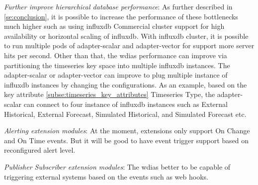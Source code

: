 \emph{Further improve hierarchical database performance}:
As further described in \ref{se:conclusion}, it is possible to increase the performance of these bottlenecks much higher such as using \acrshort{influxdb} Commercial cluster support for high availability or horizontal scaling of \acrshort{influxdb}. With \acrshort{influxdb} cluster, it is possible to run multiple pods of adapter-scalar and adapter-vector for support more server hits per second.
Other than that, the \acrshort{wdias} performance can improve via partitioning the timeseries key space into multiple \acrshort{influxdb} instances. The adapter-scalar or adapter-vector can improve to plug multiple instance of \acrshort{influxdb} instances by changing the configurations. As an example, based on the key attribute \ref{subse:timeseries_key_attributes} Timeseries Type, the adapter-scalar can connect to four instance of \acrshort{influxdb} instances such as  External Historical, External Forecast, Simulated Historical, and Simulated Forecast etc.

\emph{Alerting extension modules}:
At the moment, extensions only support On Change and On Time events. But it will be good to have event trigger support based on reconfigured alert level.

\emph{Publisher Subscriber extension modules}:
The \acrshort{wdias} better to be capable of triggering external systems based on the events such as web hooks.
